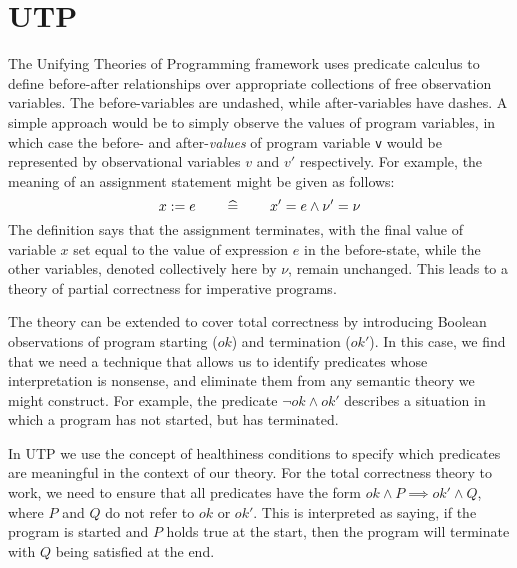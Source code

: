 \section{UTP}\label{sec:UTP}

The Unifying Theories of Programming framework \cite{Hoare-He98}
uses predicate calculus to define before-after relationships
over appropriate collections of free observation variables.
The before-variables are undashed,
while after-variables have dashes.
A simple approach would be to simply observe the values of program variables,
in which case the before- and after-\emph{values}
of program variable \texttt{v}
would be represented by observational variables $v$ and $v'$ respectively.
For example,
the meaning of an assignment statement might be given as follows:
\begin{equation*}
  x := e  \qquad\mathrel{\widehat=}\qquad  x' = e \land \nu'=\nu
\end{equation*}
The definition says that the assignment terminates,
with the final value of variable $x$ set equal
to the value of expression $e$ in the before-state,
while the other variables, denoted collectively here  by $\nu$, remain unchanged.
This leads to a theory of partial correctness for imperative programs.

The theory can be extended to cover total correctness by introducing
Boolean observations of program starting ($ok$) and termination ($ok'$).
In this case, we find that we need a technique that allows us to identify
predicates whose interpretation is nonsense, and eliminate them from any
semantic theory we might construct.
For example, the predicate $\lnot ok \land ok'$ describes a situation
in which a program has not started, but has terminated.

In UTP we use the concept of healthiness conditions to specify which predicates
are meaningful in the context of our theory.
For the total correctness theory to work,
we need to ensure that all predicates have the form
$ok \land P \implies ok' \land Q$, where $P$ and $Q$ do not refer to $ok$ or $ok'$.
This is interpreted as saying,
if the program is started and $P$ holds true at the start,
then the program will terminate with $Q$ being satisfied at the end.

